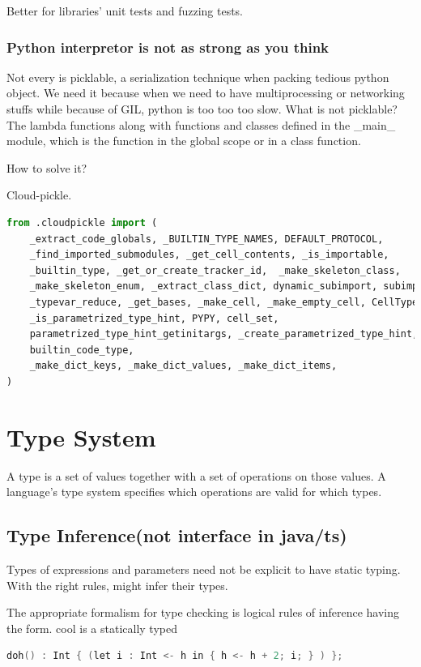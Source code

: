 \documentclass[a4paper]{article}
\theoremstyle{definition}
\begin{document}
Better for libraries' unit tests and fuzzing tests.

\subsubsection{Python interpretor is not as strong as you think}
Not every is picklable, a serialization technique when packing tedious python object. We need it because when we need to have multiprocessing or networking stuffs while because of GIL, python is too too too slow. What is not picklable?
The lambda functions along with functions and classes defined in the \_main\_ module, which is the function in the global scope or in a class function.

How to solve it?

Cloud-pickle.
\begin{lstlisting}[language=Python]
from .cloudpickle import (
    _extract_code_globals, _BUILTIN_TYPE_NAMES, DEFAULT_PROTOCOL,
    _find_imported_submodules, _get_cell_contents, _is_importable,
    _builtin_type, _get_or_create_tracker_id,  _make_skeleton_class,
    _make_skeleton_enum, _extract_class_dict, dynamic_subimport, subimport,
    _typevar_reduce, _get_bases, _make_cell, _make_empty_cell, CellType,
    _is_parametrized_type_hint, PYPY, cell_set,
    parametrized_type_hint_getinitargs, _create_parametrized_type_hint,
    builtin_code_type,
    _make_dict_keys, _make_dict_values, _make_dict_items,
)
\end{lstlisting}
\section{Type System}
A type is a set of values together with a set of operations on those values. A language's type system specifies which operations are valid for which types. 

\subsection{Type Inference(not interface in java/ts)}
Types of expressions and parameters need not be explicit to have static typing. With the right rules, might infer their types.

The appropriate formalism for type checking is logical rules of inference having the form. cool is a statically typed

\begin{lstlisting}[language=C]
  doh() : Int { (let i : Int <- h in { h <- h + 2; i; } ) };
\end{lstlisting}
\end{document}
